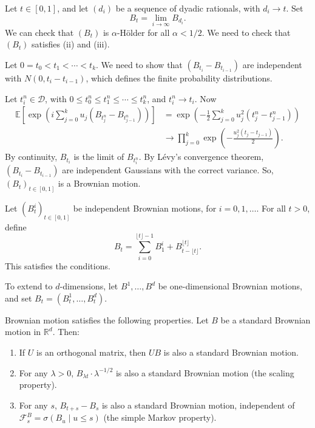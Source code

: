 \documentclass[12pt]{article}
\begin{document}
\begin{proofbox}
	Let $t \in [0, 1]$, and let $(d_i)$ be a sequence of dyadic rationals, with $d_i \to t$. Set
	\[
	B_t = \lim_{i \to \infty} B_{d_i}.
	\]
	We can check that $(B_t)$ is $\alpha$-H\"older for all $\alpha < 1/2$. We need to check that $(B_t)$ satisfies (ii) and (iii).

	Let $0 = t_0 < t_1 < \cdots < t_k$. We need to show that $(B_{t_i} - B_{t_{i-1}})$ are independent with $N(0, t_{i} - t_{i-1})$, which defines the finite probability distributions.

	Let $t_i^n \in \mathcal{D}$, with $0 \leq t_0^n \leq t_1^n \leq \cdots \leq t_k^n$, and $t_i^n \to t_i$. Now
	\begin{align*}
		\mathbb{E}\left[ \exp \left( i \sum_{j = 0}^k u_j (B_{t_j^n} - B_{t_{j-1}^n}) \right) \right] &= \exp \left( - \frac{1}{2} \sum_{j = 0}^k u_j^2(t_{j}^n - t_{j-1}^n) \right) \\
													      &\to \prod_{j = 0}^k \exp \left( - \frac{u_j^2(t_j - t_{j-1})}{2} \right).
	\end{align*}
	By continuity, $B_{t_i}$ is the limit of $B_{t_i^n}$. By L\'evy's convergence theorem, $(B_{t_i} - B_{t_{i-1}})$ are independent Gaussians with the correct variance. So, $(B_t)_{t \in [0, 1]}$ is a Brownian motion.

	Let $(B_t^i)_{t \in [0, 1]}$ be independent Brownian motions, for $i  = 0, 1, \ldots$. For all $t > 0$, define
	\[
	B_t = \sum_{i = 0}^{\lfloor t \rfloor - 1} B_1^i + B_{t - \lfloor t \rfloor}^{\lfloor t \rfloor}.
	\]
	This satisfies the conditions.

	To extend to $d$-dimensions, let $B^1, \ldots, B^d$ be one-dimensional Brownian motions, and set $B_t = (B_t^1, \ldots, B_t^d)$.
\end{proofbox}

Brownian motion satisfies the following properties. Let $B$ be a standard Brownian motion in $\mathbb{R}^d$. Then:
\begin{enumerate}
	\item If $U$ is an orthogonal matrix, then $UB$ is also a standard Brownian motion.
	\item For any $\lambda > 0$, $B_{\lambda t} \cdot \lambda^{-1/2}$ is also a standard Brownian motion (the scaling property).
	\item For any $s$, $B_{t + s} - B_s$ is also a standard Brownian motion, independent of $\mathcal{F}_s^B = \sigma(B_u \mid u \leq s)$ (the simple Markov property).
\end{enumerate}
\end{document}
